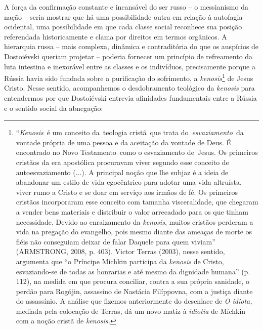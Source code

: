 A força da confirmação constante e incansável do ser russo -- o
messianismo da nação -- seria mostrar que há uma possibilidade outra em
relação à autofagia ocidental, uma possibilidade em que cada classe
social reconhece sua posição referendada historicamente e clama por
direitos em termos orgânicos. A hierarquia russa -- mais complexa,
dinâmica e contraditória do que os auspícios de Dostoiévski queriam
projetar -- poderia fornecer um princípio de refreamento da luta
intestina e inexorável entre as classes e os indivíduos, precisamente
porque a Rússia havia sido fundada sobre a purificação do sofrimento, a
\emph{kenosis}\footnote{``\emph{Kenosis}~é um conceito da~teologia
  cristã~que trata do~\emph{esvaziamento}~da vontade própria de uma
  pessoa e da aceitação da vontade de Deus. É encontrado no Novo
  Testamento~como o esvaziamento de~Jesus. Os primeiros cristãos da era
  apostólica procuravam viver segundo esse conceito de autoesvaziamento
  (...). A principal noção que lhe subjaz é a ideia de abandonar um
  estilo de vida egocêntrico para adotar uma vida altruísta, viver rumo
  a Cristo e se doar em serviço aos irmãos de fé. Os primeiros cristãos
  incorporaram esse conceito com tamanha visceralidade, que chegaram a
  vender bens materiais e distribuir o valor arrecadado para os que
  tinham necessidade. Devido ao enraizamento da \emph{kenosis}, muitos
  cristãos perderam a vida na pregação do evangelho, pois mesmo diante
  das ameaças de morte os fiéis não conseguiam deixar de falar Daquele
  para quem viviam'' (ARMSTRONG, 2008, p. 403). Victor Terras (2003),
  nesse sentido, argumenta que ``o Príncipe Míchkin participa da
  \emph{kenosis} de Cristo, esvaziando-se de todas as honrarias e até
  mesmo da dignidade humana'' (p. 112), na medida em que procura
  conciliar, contra a sua própria sanidade, o perdão para Rogójin,
  assassino de Nastácia Filíppovna, com a justiça diante do assassínio.
  A análise que fizemos anteriormente do desenlace de \emph{O idiota,}
  mediada pela colocação de Terras, dá um novo matiz à \emph{idiotia} de
  Míchkin com a noção cristã de \emph{kenosis. }} de Jesus Cristo. Nesse
sentido, acompanhemos o desdobramento teológico da \emph{kenosis} para
entendermos por que Dostoiévski entrevia afinidades fundamentais entre a
Rússia e o sentido social da abnegação:

